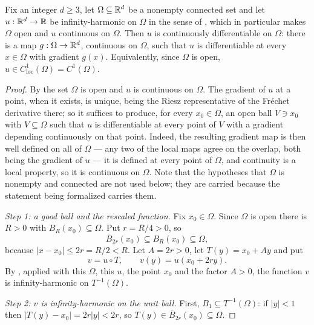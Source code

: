 \begin{corollary}
Fix an integer $d\ge3$, let $\Omega\subseteq\mathbb{R}^d$ be a nonempty connected set
and let $u:\mathbb{R}^d\to\mathbb{R}$ be infinity-harmonic on $\Omega$ in the sense of
, which in particular makes $\Omega$ open and $u$
continuous on $\Omega$. Then $u$ is continuously differentiable on $\Omega$:
there is a map $g:\Omega\to\mathbb{R}^d$, continuous on $\Omega$, such that $u$ is
differentiable at every $x\in\Omega$ with gradient $g(x)$. Equivalently, since
$\Omega$ is open, $u\in C^1_{\mathrm{loc}}(\Omega)=C^1(\Omega)$.
\end{corollary}
\begin{proof}
By  the set $\Omega$ is open and $u$ is continuous on
$\Omega$. The gradient of $u$ at a point, when it exists, is unique, being the
Riesz representative of the Fr\'echet derivative there; so it suffices to
produce, for every $x_0\in\Omega$, an open ball $V\ni x_0$ with $V\subseteq
\Omega$ such that $u$ is differentiable at every point of $V$ with a gradient
depending continuously on that point. Indeed, the resulting gradient map is then
well defined on all of $\Omega$ — any two of the local maps agree on the
overlap, both being the gradient of $u$ — it is defined at every point of
$\Omega$, and continuity is a local property, so it is continuous on $\Omega$.
Note that the hypotheses that $\Omega$ is nonempty and connected are not used
below; they are carried because the statement being formalized carries them.

\emph{Step 1: a good ball and the rescaled function.}
Fix $x_0\in\Omega$. Since $\Omega$ is open there is $R>0$ with
$B_R(x_0)\subseteq\Omega$. Put $r=R/4>0$, so
\[
  \overline B_{2r}(x_0)\subseteq B_R(x_0)\subseteq\Omega ,
\]
because $|x-x_0|\le2r=R/2<R$. Let $A=2r>0$, let $T(y)=x_0+Ay$ and put
\[
  v=u\circ T,\qquad v(y)=u(x_0+2ry).
\]
By , applied with this $\Omega$, this $u$, the point
$x_0$ and the factor $A>0$, the function $v$ is infinity-harmonic on
$T^{-1}(\Omega)$.

\emph{Step 2: $v$ is infinity-harmonic on the unit ball.}
First, $B_1\subseteq T^{-1}(\Omega)$: if $|y|<1$ then
$|T(y)-x_0|=2r|y|<2r$, so $T(y)\in\overline B_{2r}(x_0)\subseteq\Omega$.


\end{proof}
